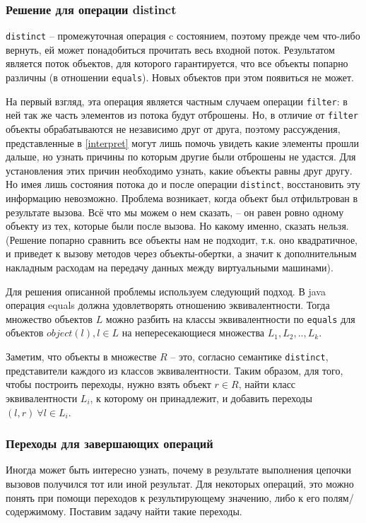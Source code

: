 \subsubsection{Решение для операции distinct}\label{distinct}
\texttt{distinct} -- промежуточная операция c состоянием, поэтому прежде чем что-либо вернуть, ей может понадобиться прочитать весь входной поток. Результатом является поток объектов, для которого гарантируется, что все объекты попарно различны (в отношении \texttt{equals}\cite{java:equals}). Новых объектов при этом появиться не может.

На первый взгляд, эта операция является частным случаем операции \texttt{filter}: в ней так же часть элементов из потока будут отброшены. Но, в отличие от \texttt{filter} объекты обрабатываются не независимо друг от друга, поэтому рассуждения, представленные в \ref{interpret} могут лишь помочь увидеть какие элементы прошли дальше, но узнать причины по которым другие были отброшены не удастся. Для установления этих причин необходимо узнать, какие объекты равны друг другу. Но имея лишь состояния потока до и после операции \texttt{distinct}, восстановить эту информацию невозможно. Проблема возникает, когда объект был отфильтрован в результате вызова. Всё что мы можем о нем сказать, -- он равен ровно одному объекту из тех, которые были после вызова. Но какому именно, сказать нельзя. (Решение попарно сравнить все объекты нам не подходит, т.к. оно квадратичное, и приведет к вызову методов через объекты-обертки, а значит к дополнительным накладным расходам на передачу данных между виртуальными машинами).

Для решения описанной проблемы используем следующий подход. В java операция equals должна удовлетворять отношению эквивалентности. Тогда множество объектов $L$ можно разбить на классы эквивалентности по \texttt{equals} для объектов $object(l), l \in L$ на непересекающиеся множества $L_1, L_2, .., L_k$. 

Заметим, что объекты в множестве $R$ -- это, согласно семантике \texttt{distinct}, представители каждого из классов эквивалентности. Таким образом, для того, чтобы построить переходы, нужно взять объект $r \in R$, найти класс эквивалентности $L_i$, к которому он принадлежит, и добавить переходы $(l, r) \ \forall l \in L_i$.

\subsubsection{Переходы для завершающих операций}
Иногда может быть интересно узнать, почему в результате выполнения цепочки вызовов получился тот или иной результат. Для некоторых операций, это можно понять при помощи переходов к результирующему значению, либо к его полям/содержимому. Поставим задачу найти такие переходы.

